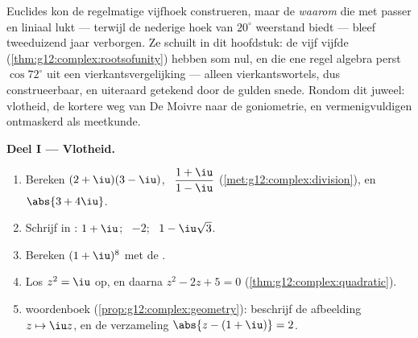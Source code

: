 \begin{problem}
\label{pb:g12:complex:1}
Euclides kon de regelmatige vijfhoek construeren, maar de  \emph{waarom}
die met passer en liniaal lukt --- terwijl de nederige hoek van $20^\circ$
weerstand biedt --- bleef tweeduizend jaar verborgen. Ze schuilt in dit
hoofdstuk: de vijf vijfde 
(\cref{thm:g12:complex:rootsofunity}) hebben som nul, en die ene regel algebra
perst $\cos 72^\circ$ uit een vierkantsvergelijking --- alleen
vierkantswortels, dus construeerbaar, en uiteraard getekend door de gulden
snede. Rondom dit juweel: vlotheid, de kortere weg van De Moivre naar de
goniometrie, en vermenigvuldigen ontmaskerd als meetkunde.

\medskip
\noindent\textbf{Deel I --- Vlotheid.}
\begin{enumerate}
  \item Bereken $(2 + \iu)(3 - \iu)$, \ $\dfrac{1 + \iu}{1 - \iu}$
        (\cref{met:g12:complex:division}), en $\abs{3 + 4\iu}$.
  \item Schrijf in : $1 + \iu$; \ $-2$; \
        $1 - \iu\sqrt3$.
  \item Bereken $(1 + \iu)^8$ met de .
  \item Los $z^2 = \iu$ op, en daarna $z^2 - 2z + 5 = 0$
        (\cref{thm:g12:complex:quadratic}).
  \item {} woordenboek (\cref{prop:g12:complex:geometry}): beschrijf
        de afbeelding $z \mapsto \iu z$, en de verzameling
        $\abs{z - (1 + \iu)} = 2$.
\end{enumerate}


\end{problem}
